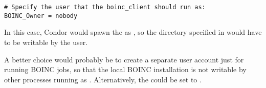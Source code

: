 \footnotesize
\begin{verbatim}
# Specify the user that the boinc_client should run as:
BOINC_Owner = nobody
\end{verbatim}
\normalsize

In this case, Condor would spawn the  as
, so the directory specified in 
would have to be writable by the  user.

A better choice would probably be to create a separate user account
just for running BOINC jobs, so that the local BOINC installation is
not writable by other processes running as .
Alternatively, the  could be set to
. 

\noindent {}

